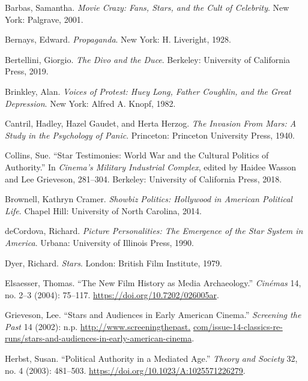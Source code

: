 \documentclass{tufte-handout}
\begin{document}
\begin{hangparas}{.25in}{1} 



Barbas, Samantha. \emph{Movie Crazy: Fans, Stars, and the Cult of
Celebrity}. New York: Palgrave, 2001.

Bernays, Edward. \emph{Propaganda}. New York: H. Liveright, 1928.

Bertellini, Giorgio. \emph{The Divo and the Duce}. Berkeley: University
of California Press, 2019.

Brinkley, Alan. \emph{Voices of Protest: Huey Long, Father Coughlin, and
the Great Depression}. New York: Alfred A. Knopf, 1982.

Cantril, Hadley, Hazel Gaudet, and Herta Herzog. \emph{The Invasion From
Mars: A Study in the Psychology of Panic}. Princeton: Princeton
University Press, 1940.

Collins, Sue. ``Star Testimonies: World War and the Cultural Politics of
Authority.'' In \emph{Cinema's Military Industrial Complex}, edited by
Haidee Wasson and Lee Grieveson, 281--304. Berkeley: University of
California Press, 2018.

Brownell, Kathryn Cramer. \emph{Showbiz Politics: Hollywood in American
Political Life}. Chapel Hill: University of North Carolina, 2014.

deCordova, Richard. \emph{Picture Personalities: The Emergence of the
Star System in America}. Urbana: University of Illinois Press, 1990.

Dyer, Richard. \emph{Stars}. London: British Film Institute, 1979.

Elsaesser, Thomas. ``The New Film History as Media Archaeology.''
\emph{Cinémas} 14, no. 2--3 (2004): 75--117.
\url{https://doi.org/10.7202/026005ar}.

Grieveson, Lee. ``Stars and Audiences in Early American Cinema.''
\emph{Screening the Past} 14 (2002): n.p. \href{http://www.screeningthepast.com/issue-14-classics-re-runs/stars-and-audiences-in-early-american-cinema}{http://www.screeningthepast.} \href{http://www.screeningthepast.com/issue-14-classics-re-runs/stars-and-audiences-in-early-american-cinema}{com/issue-14-classics-re-runs/stars-and-audiences-in-early-american-cinema}.

Herbst, Susan. ``Political Authority in a Mediated Age.'' \emph{Theory
and Society} 32, no. 4 (2003): 481--503.
\url{https://doi.org/10.1023/A:1025571226279}.


\end{hangparas}
\end{document}
